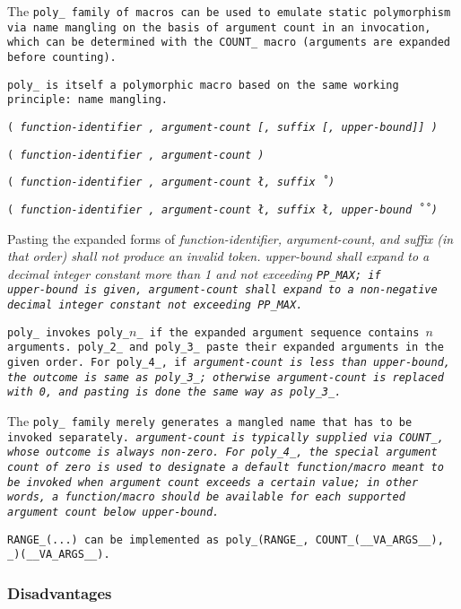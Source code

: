 \def\Subsubsection#1{\subsubsection{#1}}

The \tt{poly_} family of macros can be used to emulate static polymorphism via
name mangling on the basis of argument count in an invocation, which can be
determined with the \tt{COUNT_} macro (arguments are expanded before counting).

\note \tt{poly_} is itself a polymorphic macro
based on the same working principle: name mangling.


\s\s\s\tt{(}
\it{function-identifier}
  \tt{,} \it{argument-count}
 [\tt{,} \it{suffix}
 [\tt{,} \it{upper-bound}]]
  \tt{)}

\s\tt{(}
\it{function-identifier}
  \tt{,} \it{argument-count}
  \tt{)}

\s\tt{(}
\it{function-identifier}
  \tt{,} \it{argument-count}
\l\tt{,} \it{suffix}\r
\ \tt{)}

\s\tt{(} \it{function-identifier}
  \tt{,} \it{argument-count}
\l\tt{,} \it{suffix}
\l\tt{,} \it{upper-bound}\r\r
\ \tt{)}


Pasting the expanded forms of \it{function-identifier}, \it{argument-count},
and \it{suffix} (in that order) shall not produce an invalid token.
\it{upper-bound} shall expand to a decimal integer constant more than 1 and not
exceeding \tt{PP_MAX}; if\\\it{upper-bound} is given, \it{argument-count} shall
expand to a non-negative decimal integer constant not exceeding \tt{PP_MAX}.


\tt{poly_} invokes \tt{poly_}$n$\_ if the
expanded argument sequence contains $n$ arguments.
\tt{poly_2_} and \tt{poly_3_} paste their expanded arguments in the given order.
For \tt{poly_4_}, if \it{argument-count} is less than \it{upper-bound},
the outcome is same as \tt{poly_3_}; otherwise \it{argument-count} is
replaced with \tt{0}, and pasting is done the same way as \tt{poly_3_}.

\note The \tt{poly_} family merely generates a
mangled name that has to be invoked separately.
\it{argument-count} is typically supplied via
\tt{COUNT_}, whose outcome is always non-zero.
For \tt{poly_4_}, the special argument count of zero is used to
designate a default function/macro meant to be invoked when argument
count exceeds a certain value; in other words, a function/macro should
be available for each supported argument count below \it{upper-bound}.

\example \tt{RANGE_(...)} can be implemented as
\tt{poly_(RANGE_, COUNT_(__VA_ARGS__), _)(__VA_ARGS__)}.

\Subsubsection{Disadvantages}
